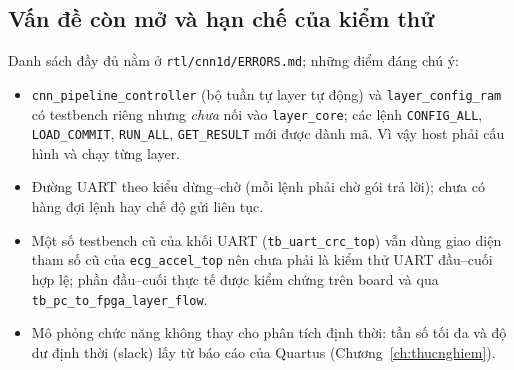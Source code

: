 \subsection{Vấn đề còn mở và hạn chế của kiểm thử}
Danh sách đầy đủ nằm ở \texttt{rtl/cnn1d/ERRORS.md}; những điểm đáng chú ý:
\begin{itemize}
  \item \texttt{cnn\_pipeline\_controller} (bộ tuần tự layer tự động) và \texttt{layer\_config\_ram} có testbench riêng nhưng \emph{chưa} nối vào \texttt{layer\_core}; các lệnh \texttt{CONFIG\_ALL}, \texttt{LOAD\_COMMIT}, \texttt{RUN\_ALL}, \texttt{GET\_RESULT} mới được dành mã.
  Vì vậy host phải cấu hình và chạy từng layer.
  \item Đường UART theo kiểu dừng--chờ (mỗi lệnh phải chờ gói trả lời); chưa có hàng đợi lệnh hay chế độ gửi liên tục.
  \item Một số testbench cũ của khối UART (\texttt{tb\_uart\_crc\_top}) vẫn dùng giao diện tham số cũ của \texttt{ecg\_accel\_top} nên chưa phải là kiểm thử UART đầu--cuối hợp lệ; phần đầu--cuối thực tế được kiểm chứng trên board và qua \texttt{tb\_pc\_to\_fpga\_layer\_flow}.
  \item Mô phỏng chức năng không thay cho phân tích định thời: tần số tối đa và độ dư định thời (slack) lấy từ báo cáo của Quartus (Chương~\ref{ch:thucnghiem}).
\end{itemize}
